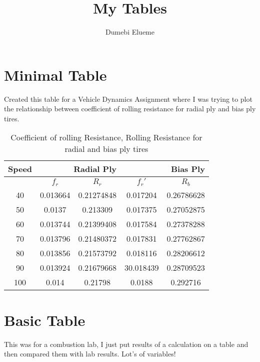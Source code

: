 \documentclass{article}
\title{My Tables}
\author{Dumebi Elueme}
\begin{document}
\maketitle

\section{Minimal Table}
Created this table for a Vehicle Dynamics Assignment where I was trying to plot the relationship between coefficient of rolling resistance for radial ply and bias ply tires.

\begin{table}[!htbp]
\centering
\begin{tabular}{*5c}
\toprule
Speed &  \multicolumn{2}{r}{Radial Ply} & \multicolumn{2}{r}{Bias Ply}\\
\midrule
{}   & $f_r$        & $R_r$     & $f_r'$    & $R_b$\\
\midrule
40   &  0.013664    & 0.21274848 & 0.017204 & 0.26786628\\
50   &  0.0137      & 0.213309 & 0.017375   & 0.27052875\\
60   &  0.013744    & 0.21399408 & 0.017584 & 0.27378288\\
70   &  0.013796    & 0.21480372 & 0.017831 & 0.27762867\\
80   & 0.013856     & 0.21573792 & 0.018116 & 0.28206612\\
90   &  0.013924  &  0.21679668   & 30.018439  & 0.28709523\\
100   &  0.014  &  0.21798   & 0.0188  & 0.292716\\
\bottomrule
\end{tabular}
\caption{Coefficient of rolling Resistance, Rolling Resistance for radial and bias ply tires}
\end{table}

\section{Basic Table}
This was for a combustion lab, I just put results of a calculation on a table and then compared them with lab results. Lot's of variables!
\end{document}
